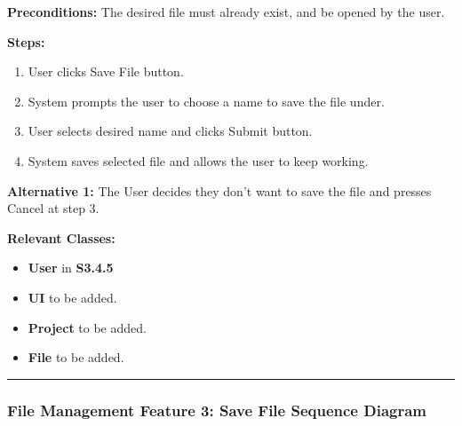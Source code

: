 \documentclass[twoside,letterpaper]{article}
\begin{document}
\noindent\textbf{Preconditions:} The desired file must already exist, and be opened by the user. \newline

\noindent\textbf{Steps:} \begin{enumerate}
	\item User clicks Save File button.
	\item System prompts the user to choose a name to save the file under.
	\item User selects desired name and clicks Submit button.
	\item System saves selected file and allows the user to keep working.

\end{enumerate}
\noindent\textbf{Alternative 1:} The User decides they don't want to save the file and presses Cancel at step 3. \newline

\noindent\textbf{Relevant Classes:}
\begin{itemize}
	\item \textbf{User} in \textbf{S3.4.5}
	\item \textbf{UI} to be added.
	\item \textbf{Project} to be added.
	\item \textbf{File} to be added.
\end{itemize}
\vspace{8pt}
\hrule

\newpage

\subsubsection[File Management Feature 3: Save File Sequence Diagram]{\rmfamily\bfseries\color{black}
	File Management Feature 3: Save File Sequence Diagram}
\hypertarget{RefHeading22059017292}{}
\end{document}
